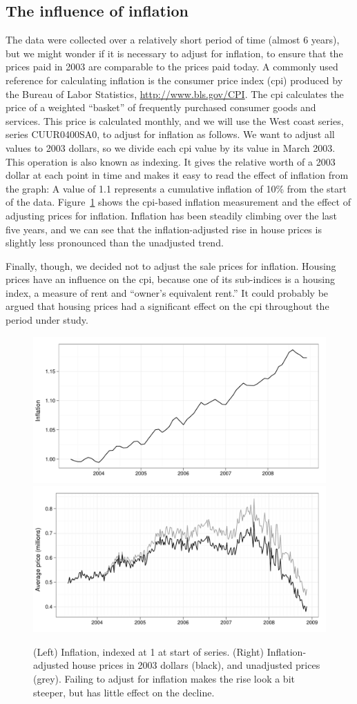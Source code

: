 \documentclass[oneside]{article}
\begin{document}
\subsection{The influence of inflation}

The data were collected over a relatively short period of time (almost 6 years), but we might wonder if it is necessary to adjust for inflation, to ensure that the prices paid in 2003 are comparable to the prices paid today.  A commonly used reference for calculating inflation is the consumer price index ({\sc cpi}) produced by the Bureau of Labor Statistics, \url{http://www.bls.gov/CPI}.  The {\sc cpi} calculates the price of a weighted ``basket'' of frequently purchased consumer goods and services.  This price is calculated monthly, and we will use the West coast series, series CUUR0400SA0, to adjust for inflation as follows.  We want to adjust all values to 2003 dollars, so we divide each {\sc cpi} value by its value in March 2003.  This operation is also known as indexing.  It gives the relative worth of a 2003 dollar at each point in time and makes it easy to read the effect of inflation from the graph: A value of 1.1 represents a cumulative inflation of 10\% from the start of the data.  
Figure~\ref{fig:inflation} shows the {\sc cpi}-based inflation measurement and the effect of adjusting prices for inflation.  Inflation has been steadily climbing over the last five years, and we can see that the inflation-adjusted rise in house prices is slightly less pronounced than the unadjusted trend. 

Finally, though, we decided not to adjust the sale prices for inflation. Housing prices have an influence on the {\sc cpi}, because one of its sub-indices is a housing index, a measure of rent and ``owner's equivalent rent.''  It could probably be argued that housing prices had a significant effect on the {\sc cpi} throughout the period under study.

\begin{figure}[htbp]
  \centering
    \includegraphics[width=0.5 \linewidth]{daily-cpi}%
    \includegraphics[width=0.5 \linewidth]{daily-price-adj}
  \caption{(Left) Inflation, indexed at 1 at start of series.  (Right) Inflation-adjusted house prices in 2003 dollars (black), and unadjusted prices (grey).  Failing to adjust for inflation makes the rise look a bit steeper, but has little effect on the decline.}
  \label{fig:inflation}
\end{figure}
\end{document}
